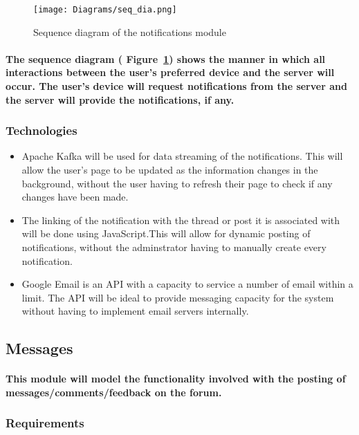 \documentclass[12pt]{article}
\begin{document}
\begin{figure}[h]
\texttt{[image: Diagrams/seq\_dia.png]}
\caption{Sequence diagram of the notifications module}
\label{seq_dia}
\end{figure}

\paragraph{The sequence diagram ( Figure~\ref{seq_dia}) shows the manner in which all interactions between the user's preferred device and the server will occur. The user's device will request notifications from the server and the server will provide the notifications, if any.}


\subsubsection{Technologies}

\begin{itemize}
\item Apache Kafka will be used for data streaming of the notifications. This will allow the user's page to be updated as the information changes in the background, without the user having to refresh their page to check if any changes have been made.
\item The linking of the notification with the thread or post it is associated with will be done using JavaScript.This will allow for dynamic posting of notifications, without the adminstrator having to manually create every notification.
\item Google Email is an API with a capacity to service a number of email within a limit. The API will be ideal to provide messaging capacity for the system without having to implement email servers internally.
\end{itemize}

\newpage
\subsection{Messages}
\paragraph{This module will model the functionality involved with the posting of messages/comments/feedback on the forum.}

\subsubsection{Requirements}
\end{document}
